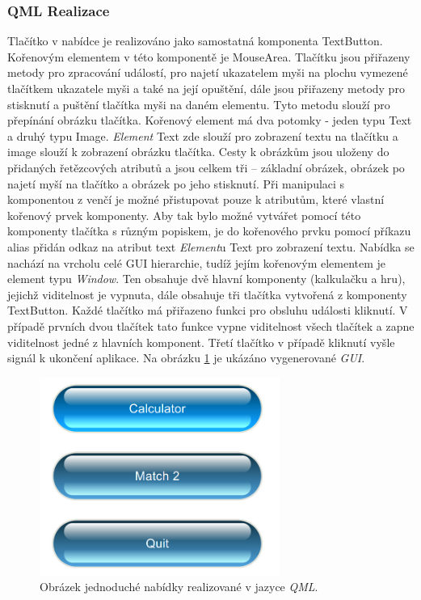 \documentclass[11pt,twoside,a4paper]{book}
\begin{document}
{{\begin{ttemize}
{{\begin{lastlisting}[frame=single,caption=Řešení v pseudokódu problematického použití operátoru "." v přiřazovacím výroku,label=lst:var0N]
\subsubsection{QML Realizace}
Tlačítko v nabídce je realizováno jako samostatná komponenta TextButton.  Kořenovým elementem v této komponentě je MouseArea. Tlačítku jsou přiřazeny metody pro zpracování událostí, pro najetí ukazatelem myši na plochu vymezené tlačítkem ukazatele myši a také na její opuštění, dále jsou přiřazeny metody pro stisknutí a puštění tlačítka myši na daném elementu. Tyto metodu slouží pro přepínání obrázku tlačítka. Kořenový element má dva potomky - jeden typu Text a druhý typu Image. \textit{Element} Text zde slouží pro zobrazení textu na tlačítku a image slouží k zobrazení obrázku tlačítka. Cesty k obrázkům jsou uloženy do přidaných řetězcových atributů a jsou celkem tři – základní obrázek, obrázek po najetí myší na tlačítko a obrázek po jeho stisknutí. 
Při manipulaci s komponentou z venčí je možné přistupovat pouze k atributům, které vlastní kořenový prvek komponenty. Aby tak bylo možné vytvářet pomocí této komponenty tlačítka s různým popiskem, je do kořenového prvku pomocí příkazu alias přidán odkaz na atribut text \textit{Element}u Text pro zobrazení textu.
Nabídka se nachází na vrcholu celé GUI hierarchie, tudíž jejím kořenovým elementem je element typu \textit{Window}. Ten obsahuje dvě hlavní komponenty (kalkulačku a hru), jejichž viditelnost je vypnuta, dále obsahuje tři tlačítka vytvořená z komponenty TextButton. Každé tlačítko má přiřazeno funkci pro obsluhu události kliknutí. V případě prvních dvou tlačítek tato funkce vypne viditelnost všech tlačítek a zapne viditelnost jedné z hlavních komponent. Třetí tlačítko v případě kliknutí vyšle signál k ukončení aplikace. Na obrázku \ref{fig:outMenuQML} je ukázáno vygenerované \textit{GUI}.
\begin{figure}[!ht]
\begin{center}
  \includegraphics[width=0.7\textwidth]{qmlMenu}
\caption{{\label{fig:outMenuQML}}Obrázek jednoduché nabídky realizované v jazyce \textit{QML}.}
\end{center}
\end{figure}


\end{lastlisting}}}
\end{ttemize}}}
\end{document}
